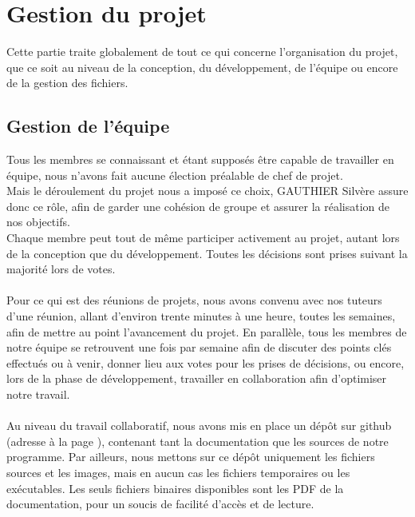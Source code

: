\documentclass[a4paper]{memoir}
\begin{document}
	\chapter{Gestion du projet}
		Cette partie traite globalement de tout ce qui concerne l'organisation du projet, que ce soit au niveau de la conception, du développement, de 
		l'équipe ou encore de la gestion des fichiers.
		
		\section{Gestion de l'équipe}
			Tous les membres se connaissant et étant supposés être capable de travailler en équipe, nous n'avons fait aucune élection préalable de chef de 
			projet.\\ Mais le déroulement du projet nous a imposé ce choix, GAUTHIER Silvère assure donc ce rôle, afin de garder une cohésion de groupe 
			et assurer la réalisation de nos objectifs.\\ Chaque membre peut tout de même participer activement au projet, autant lors de la conception que 
			du développement. Toutes les décisions sont prises suivant la majorité lors de votes.\\\\
			Pour ce qui est des réunions de projets, nous avons convenu avec nos tuteurs d'une réunion, allant d'environ trente minutes à une heure, toutes 
			les semaines, afin de mettre au point l'avancement du projet. En parallèle, tous les membres de notre équipe se retrouvent une fois par semaine 
			afin de discuter des points clés effectués ou à venir, donner lieu aux votes pour les prises de décisions, ou encore, lors de la phase de 
			développement, travailler en collaboration afin d'optimiser notre travail.\\\\
			Au niveau du travail collaboratif, nous avons mis en place un dépôt sur github (adresse à la page \pageref{url:github}), contenant tant la 
			documentation que les sources de notre programme. Par ailleurs, nous mettons sur ce dépôt uniquement les fichiers sources et les images, mais 
			en aucun cas les fichiers temporaires ou les exécutables. Les seuls fichiers binaires disponibles sont les PDF de la documentation, pour un 
			soucis de facilité d'accès et de lecture.
\end{document}
